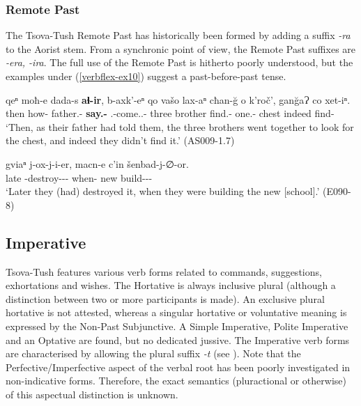 \subsubsection{Remote Past}

The Tsova-Tush Remote Past has historically been formed by adding a suffix \textit{-ra} to the Aorist stem. From a synchronic point of view, the Remote Past suffixes are \textit{-era, -ira}. The full use of the Remote Past is hitherto poorly understood, but the examples under  (\ref{verbflex-ex10}) suggest a past-before-past tense. 

\begin{exe}
	\ex\label{verbflex-ex10}
	\begin{xlist}
		
		
			\ex\label{verbflex-ex10a}
			\gll qeⁿ moħ-e dada-s \textbf{aɬ-ir}, b-axk'-eⁿ qo vašo lax-aⁿ cħan-\u{g} o k'roč', gan\u{g}aɁ co xet-iⁿ.\\
			then how-{\Rel} father.{\Obl}-{\Erg} \textbf{say.{\Pfv}-{\Rem}} {\M}.{\Pl}-come.{\Pfv}.{\Pl}-{\Aor} three brother find.{\Pfv}-{\Inf} one.{\Obl}-{\Trans} {\Dist} chest indeed {\Neg} find-{\Aor}\\
			\trans `Then, as their father had told them, the three brothers went together to look for the chest, and indeed they didn't find it.'
			\hfill (AS009-1.7)
		
		
		
		
		
			\ex\label{verbflex-ex10b}
			\gll gviaⁿ j-ox-j-i-er, macn-e c'in šenbad-j-∅-or. \\
			late {\J}-destroy-{\J}-{\Tr}-{\Rem} when-{\Rel} new build-{\J}-{\Tr}-{\Imprf}\\
			\trans `Later they (had) destroyed it, when they were building the new [school].'
			\hfill (E090-8)
		
		
	\end{xlist}
\end{exe}



\subsection{Imperative} \label{imp}

Tsova-Tush features various verb forms related to commands, suggestions, exhortations and wishes. The Hortative is always inclusive plural (although a distinction between two or more participants is made). An exclusive plural hortative is not attested, whereas a singular hortative or voluntative meaning is expressed by the Non-Past Subjunctive. A Simple Imperative, Polite Imperative and an Optative are found, but no dedicated jussive. The Imperative verb forms are characterised by allowing the plural suffix \textit{-t} (see ). Note that the Perfective/Imperfective aspect of the verbal root has been poorly investigated in non-indicative forms. Therefore, the exact semantics (pluractional or otherwise) of this aspectual distinction is unknown.

